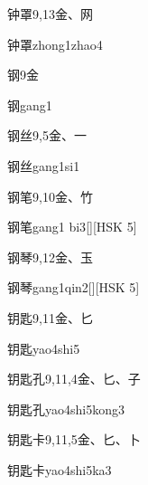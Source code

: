 \begin{entry}{钟罩}{9,13}{⾦、⽹}
  \begin{phonetics}{钟罩}{zhong1zhao4}
  \end{phonetics}
\end{entry}

\begin{entry}{钢}{9}{⾦}
  \begin{phonetics}{钢}{gang1}
  \end{phonetics}
\end{entry}

\begin{entry}{钢丝}{9,5}{⾦、⼀}
  \begin{phonetics}{钢丝}{gang1si1}
  \end{phonetics}
\end{entry}

\begin{entry}{钢笔}{9,10}{⾦、⽵}
  \begin{phonetics}{钢笔}{gang1 bi3}[][HSK 5]
  \end{phonetics}
\end{entry}

\begin{entry}{钢琴}{9,12}{⾦、⽟}
  \begin{phonetics}{钢琴}{gang1qin2}[][HSK 5]
  \end{phonetics}
\end{entry}

\begin{entry}{钥匙}{9,11}{⾦、⼔}
  \begin{phonetics}{钥匙}{yao4shi5}
  \end{phonetics}
\end{entry}

\begin{entry}{钥匙孔}{9,11,4}{⾦、⼔、⼦}
  \begin{phonetics}{钥匙孔}{yao4shi5kong3}
  \end{phonetics}
\end{entry}

\begin{entry}{钥匙卡}{9,11,5}{⾦、⼔、⼘}
  \begin{phonetics}{钥匙卡}{yao4shi5ka3}
  \end{phonetics}
\end{entry}

